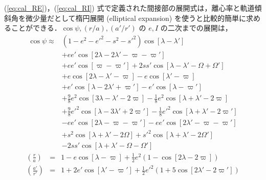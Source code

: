\documentclass[11pt,a4paper,oneside,onecolumn]{jreport}
\begin{document}
(\ref{eq:cal_RE})，(\ref{eq:cal_RI}) 式で定義された間接部の展開式は，離心率と軌道傾斜角を微少量だとして楕円展開 (elliptical expansion) を使うと比較的簡単に求めることができる．$\cos \psi, (r/a), (a'/r')$ の $e, I$ の二次までの展開は，
\begin{equation}
\begin{split}
\cos \psi \approx & (1 - e^2 - e'^2 - s^2 - s'^2) \cos [\lambda - \lambda'] \\
& + e e' \cos [2 \lambda - 2 \lambda' - \varpi - \varpi'] \\
& + e e' \cos [\varpi - \varpi'] + 2 s s' \cos [\lambda - \lambda' - \Omega + \Omega'] \\
& + e \cos [2 \lambda - \lambda' - \varpi] - e \cos [\lambda' - \varpi] \\
& + e' \cos [\lambda - 2 \lambda' + \varpi'] - e' \cos [\lambda - \varpi'] \\
& + \frac{9}{8} e^2 \cos [3 \lambda - \lambda' - 2 \varpi] - \frac{1}{8} e^2 \cos [\lambda + \lambda' - 2 \varpi] \\
& + \frac{9}{8} e'^2 \cos [\lambda - 3 \lambda' + 2 \varpi'] - \frac{1}{8} e'^2 \cos [\lambda + \lambda' - 2 \varpi'] \\
& - e e' \cos [2 \lambda - \varpi - \varpi'] - e e' \cos [2 \lambda' - \varpi - \varpi'] \\
& + s^2 \cos [\lambda + \lambda' - 2 \Omega] + s'^2 \cos [\lambda + \lambda' - 2 \Omega'] \\
& - 2 s s' \cos [\lambda + \lambda' - \Omega - \Omega']
\end{split}
\end{equation}
\begin{eqnarray}
\left( \frac{r}{a} \right) & = & 1 - e \cos [\lambda - \varpi] + \frac{1}{2} e^2 \left(1 - \cos [2 \lambda - 2 \varpi] \right) \\
\left( \frac{a'}{r'} \right) & = & 1 + 2 e' \cos [\lambda' - \varpi'] + \frac{1}{2} e'^2 \left(1 + 5 \cos [2 \lambda' - 2 \varpi'] \right)
\end{eqnarray}
\end{document}
